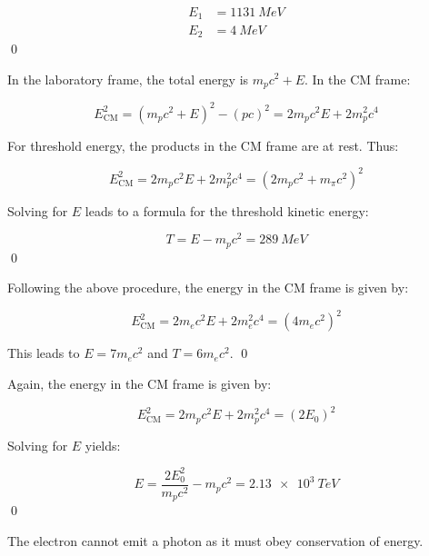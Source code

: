 \documentclass[12pt]{article}
\begin{document}
\begin{equation}
\begin{split}
    E_{1} &= \qty{1131}{MeV} \\
    E_{2} &= \qty{4}{MeV}
\end{split}
\end{equation}
\qed


In the laboratory frame, the total energy is $m_{p}c^{2} + E$. In the CM frame:

\begin{equation}
    E_{\text{CM}}^{2} = (m_{p}c^{2} + E)^{2} - (pc)^{2} = 2m_{p}c^{2}E + 2m_{p}^{2}c^{4}
\end{equation}

For threshold energy, the products in the CM frame are at rest. Thus:

\begin{equation}
    E_{\text{CM}}^{2} = 2m_{p}c^{2}E + 2m_{p}^{2}c^{4} = (2m_{p}c^{2} + m_{\pi}c^{2})^{2}
\end{equation}

Solving for $E$ leads to a formula for the threshold kinetic energy:

\begin{equation}
    T = E - m_{p}c^{2} = \qty{289}{MeV}
\end{equation}
\qed


Following the above procedure, the energy in the CM frame is given by:

\begin{equation}
    E_{\text{CM}}^{2} = 2m_{e}c^{2}E + 2m_{e}^{2}c^{4} =(4m_{e}c^{2})^{2}
\end{equation}

This leads to $E = 7m_{e}c^{2}$ and $T = 6m_{e}c^{2}$.
\qed


Again, the energy in the CM frame is given by:

\begin{equation}
    E_{\text{CM}}^{2} = 2m_{p}c^{2}E + 2m_{p}^{2}c^{4} = (2E_{0})^{2}
\end{equation}

Solving for $E$ yields:

\begin{equation}
    E = \frac{2E_{0}^{2}}{m_{p}c^{2}} - m_{p}c^{2} = \qty{2.13e3}{TeV}
\end{equation}
\qed



The electron cannot emit a photon as it must obey conservation of energy.
\end{document}
